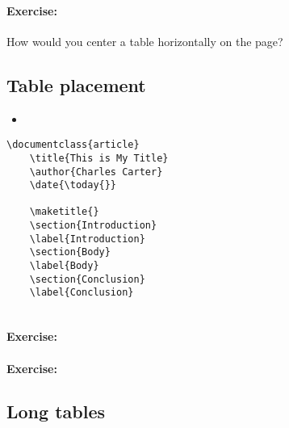         \paragraph{Exercise:} How would you center a table horizontally on the page?


        \subsection{Table placement}
        \label{Table placement}
        
        \begin{framed}
            \begin{itemize}
                \item{}
            \end{itemize}
        \end{framed}


        \begin{verbatim}
\documentclass{article}
    \title{This is My Title}
    \author{Charles Carter}
    \date{\today{}}
 
    \maketitle{}
    \section{Introduction}
    \label{Introduction}
    \section{Body}
    \label{Body}
    \section{Conclusion}
    \label{Conclusion}
    
        \end{verbatim}

        \paragraph{Exercise:}

        \paragraph{Exercise:}


        \subsection{Long tables}
        \label{Long tables}
        
